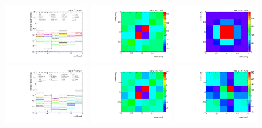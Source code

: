 \begin{figure}[htb]
\begin{center}
 \includegraphics[width=0.32\textwidth]{fig_fullRun2UL/unfolding/combined/deltaSystCombinedlog_rebinnedB_c_kk.pdf}
 \includegraphics[width=0.32\textwidth]{fig_fullRun2UL/unfolding/combined/StatCovMatrix_rebinnedB_c_kk.pdf}
 \includegraphics[width=0.32\textwidth]{fig_fullRun2UL/unfolding/combined/TotalSystCovMatrix_rebinnedB_c_kk.pdf} \\
 \includegraphics[width=0.32\textwidth]{fig_fullRun2UL/unfolding/combined/deltaSystCombinedlogNorm_rebinnedB_c_kk.pdf}
 \includegraphics[width=0.32\textwidth]{fig_fullRun2UL/unfolding/combined/StatCovMatrixNorm_rebinnedB_c_kk.pdf}
 \includegraphics[width=0.32\textwidth]{fig_fullRun2UL/unfolding/combined/TotalSystCovMatrixNorm_rebinnedB_c_kk.pdf} \\

\end{center}
\end{figure}
